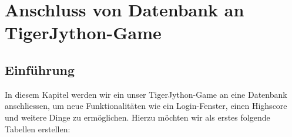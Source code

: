 \lstset{style=Python}
\chapter{Anschluss von Datenbank an TigerJython-Game}
\section{Einführung}

In diesem Kapitel werden wir ein unser TigerJython-Game an eine Datenbank anschliessen, um neue Funktionalitäten wie ein Login-Fenster, einen Highscore und weitere Dinge zu ermöglichen. Hierzu möchten wir als erstes folgende Tabellen erstellen:


%
%
%
%



